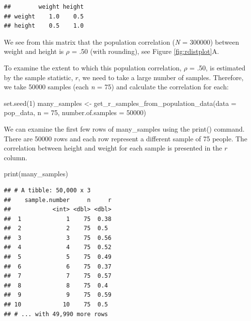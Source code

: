 \documentclass[
]{krantz}
\makeatletter
\newenvironment{Shaded}{\begin{snugshade}}{\end{snugshade}}
\newcommand{\AttributeTok}[1]{\textcolor[rgb]{0.61,0.61,0.61}{#1}}
\newcommand{\DecValTok}[1]{\textcolor[rgb]{0.06,0.06,0.06}{#1}}
\newcommand{\FunctionTok}[1]{\textcolor[rgb]{0,0,0}{#1}}
\newcommand{\NormalTok}[1]{#1}
\newcommand{\OtherTok}[1]{\textcolor[rgb]{0.37,0.37,0.37}{#1}}
\newenvironment{kframe}{%
\medskip{}
\setlength{\fboxsep}{.8em}
 \def\at@end@of@kframe{}%
 \ifinner\ifhmode%
  \def\at@end@of@kframe{\end{minipage}}%
  \begin{minipage}{\columnwidth}%
 \fi\fi%
 \def\FrameCommand##1{\hskip\@totalleftmargin \hskip-\fboxsep
 \colorbox{shadecolor}{##1}\hskip-\fboxsep
     \hskip-\linewidth \hskip-\@totalleftmargin \hskip\columnwidth}%
 \MakeFramed {\advance\hsize-\width
   \@totalleftmargin\z@ \linewidth\hsize
   \@setminipage}}%
 {\par\unskip\endMakeFramed%
 \at@end@of@kframe}
\renewenvironment{Shaded}{\begin{kframe}}{\end{kframe}}
\makeatother
\begin{document}
\begin{verbatim}
##        weight height
## weight    1.0    0.5
## height    0.5    1.0
\end{verbatim}

We see from this matrix that the population correlation (\emph{N} = 300000) between weight and height is \(\rho\) = .50 (with rounding), see Figure \ref{fig:rdistplot}A.

To examine the extent to which this population correlation, \(\rho\) = .50, is estimated by the sample statistic, \(r\), we need to take a large number of samples. Therefore, we take 50000 samples (each \emph{n} = 75) and calculate the correlation for each:

\begin{Shaded}
\begin{Highlighting}[]
\FunctionTok{set.seed}\NormalTok{(}\DecValTok{1}\NormalTok{)}
\NormalTok{many\_samples }\OtherTok{\textless{}{-}} \FunctionTok{get\_r\_samples\_from\_population\_data}\NormalTok{(}\AttributeTok{data =}\NormalTok{ pop\_data,}
                                                   \AttributeTok{n =} \DecValTok{75}\NormalTok{,}
                                                   \AttributeTok{number.of.samples =} \DecValTok{50000}\NormalTok{)}
\end{Highlighting}
\end{Shaded}

We can examine the first few rows of many\_samples using the print() command. There are 50000 rows and each row represent a different sample of 75 people. The correlation between height and weight for each sample is presented in the \(r\) column.

\begin{Shaded}
\begin{Highlighting}[]
\FunctionTok{print}\NormalTok{(many\_samples)}
\end{Highlighting}
\end{Shaded}

\begin{verbatim}
## # A tibble: 50,000 x 3
##    sample.number     n     r
##            <int> <dbl> <dbl>
##  1             1    75  0.38
##  2             2    75  0.5 
##  3             3    75  0.56
##  4             4    75  0.52
##  5             5    75  0.49
##  6             6    75  0.37
##  7             7    75  0.57
##  8             8    75  0.4 
##  9             9    75  0.59
## 10            10    75  0.5 
## # ... with 49,990 more rows
\end{verbatim}
\end{document}
